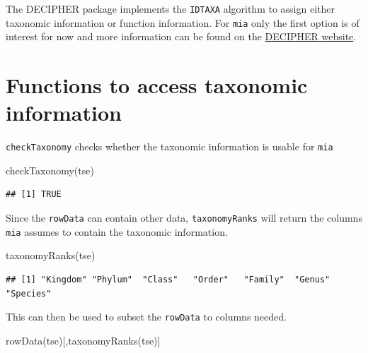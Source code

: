 \documentclass[
]{book}
\newenvironment{Shaded}{\begin{snugshade}}{\end{snugshade}}
\newcommand{\FunctionTok}[1]{\textcolor[rgb]{0.00,0.00,0.00}{#1}}
\newcommand{\NormalTok}[1]{#1}
\begin{document}
The DECIPHER package \citep{R-DECIPHER} implements the \texttt{IDTAXA} algorithm to assign
either taxonomic information or function information. For \texttt{mia}
only the first option is of interest for now and more information can be
found on the \href{http://www2.decipher.codes/Classification.html}{DECIPHER website}.

\hypertarget{functions-to-access-taxonomic-information}{%
\section{Functions to access taxonomic information}\label{functions-to-access-taxonomic-information}}

\texttt{checkTaxonomy} checks whether the taxonomic information is usable for \texttt{mia}

\begin{Shaded}
\begin{Highlighting}[]
\FunctionTok{checkTaxonomy}\NormalTok{(tse)}
\end{Highlighting}
\end{Shaded}

\begin{verbatim}
## [1] TRUE
\end{verbatim}

Since the \texttt{rowData} can contain other data, \texttt{taxonomyRanks} will return the
columns \texttt{mia} assumes to contain the taxonomic information.

\begin{Shaded}
\begin{Highlighting}[]
\FunctionTok{taxonomyRanks}\NormalTok{(tse)}
\end{Highlighting}
\end{Shaded}

\begin{verbatim}
## [1] "Kingdom" "Phylum"  "Class"   "Order"   "Family"  "Genus"   "Species"
\end{verbatim}

This can then be used to subset the \texttt{rowData} to columns needed.

\begin{Shaded}
\begin{Highlighting}[]
\FunctionTok{rowData}\NormalTok{(tse)[,}\FunctionTok{taxonomyRanks}\NormalTok{(tse)]}
\end{Highlighting}
\end{Shaded}
\end{document}
